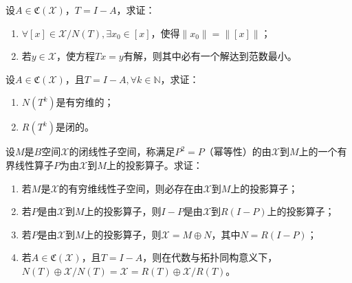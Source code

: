 \documentclass[../../main.tex]{subfiles}%
\begin{document}
\begin{example}
设$A \in \mathfrak{C}(\mathscr{X})$，$T = I - A$，求证：
\begin{enumerate}[(1)]
\item $\forall [x] \in \mathscr{X}/N(T), \exists x_0 \in [x]$，使得$\|x_0\| = \|[x]\|$；
\item 若$y \in \mathscr{X}$，使方程$Tx = y$有解，则其中必有一个解达到范数最小。
\end{enumerate}
\end{example}

\begin{example}
设$A \in \mathfrak{C}(\mathscr{X})$，且$T = I - A, \forall k \in \mathbb{N}$，求证：
\begin{enumerate}[(1)]
\item $N(T^k)$是有穷维的；
\item $R(T^k)$是闭的。
\end{enumerate}
\end{example}

\begin{example}
设$M$是$B$空间$\mathscr{X}$的闭线性子空间，称满足$P^2 = P$（幂等性）的由$\mathscr{X}$到$M$上的一个有界线性算子$P$为由$\mathscr{X}$到$M$上的投影算子。求证：
\begin{enumerate}[(1)]
\item 若$M$是$\mathscr{X}$的有穷维线性子空间，则必存在由$\mathscr{X}$到$M$上的投影算子；
\item 若$P$是由$\mathscr{X}$到$M$上的投影算子，则$I-P$是由$\mathscr{X}$到$R(I-P)$上的投影算子；
\item 若$P$是由$\mathscr{X}$到$M$上的投影算子，则$\mathscr{X} = M \oplus N$，其中$N = R(I-P)$；
\item 若$A \in \mathfrak{C}(\mathscr{X})$，且$T = I-A$，则在代数与拓扑同构意义下，$N(T) \oplus \mathscr{X}/N(T) = \mathscr{X} = R(T) \oplus \mathscr{X}/R(T)$。
\end{enumerate}
\end{example}
\end{document}
